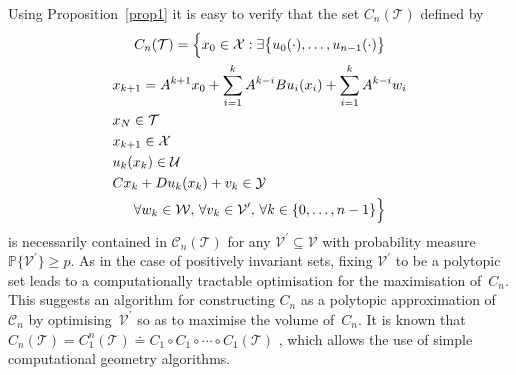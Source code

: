 \documentclass{ifacconf}
\providecommand{\C}{\mathscr C}
\providecommand{\W}{\mathcal W}
\providecommand{\V}{\mathcal V}
\providecommand{\X}{\mathcal X}
\providecommand{\Y}{\mathcal Y}
\providecommand{\U}{\mathcal U}
\providecommand{\T}{\mathcal T}
\providecommand{\PP}{\mathbb P}
\begin{document}
%
Using Proposition~\ref{prop1} it is easy to verify that the set $C_n(\T)$ defined by
%
\begin{multline*}
C_n(\T) = \Bigl\{ x_0\in\X: \exists \bigl\{u_0(\cdot),\ldots,u_{n-1}(\cdot)\bigr\}\\
\begin{aligned}
&x_{k+1} = A^{k+1} x_0 + \sum_{i=1}^{k} A^{k-i}B u_{i}(x_{i}) + \sum_{i=1}^{k} A^{k-i} w_{i}\\
&x_N\in\T\\
&x_{k+1}\in\X\\
&u_k(x_k)\in\U \\
&Cx_k+Du_k(x_k) + v_k \in\Y
\end{aligned}\\
\forall w_k\in\W,\, \forall v_k\in \V^\prime,\, \forall k\in\{0,\dots,n-1\} \Bigr\}	
\end{multline*}
%
is necessarily contained in $\C_n(\T)$ for any $\V^\prime\subseteq\V$ with probability measure $\PP\{\V^\prime\} \geq p$.
%
As in the case of positively invariant sets, fixing $\V^\prime$ to be a polytopic set leads to a computationally tractable optimisation for the maximisation of~$C_n$. This suggests an algorithm for constructing $C_n$ as a polytopic approximation of~$\C_n$ by optimising~$\V^\prime$ so as to maximise the volume of~$C_n$.
%
It is known that 
$C_n(\T) = C^n_1(\T) \doteq C_1 \circ C_1 \circ \cdots \circ C_1(\T)$ 
\citep[see e.g.][]{blanchini:2007}, which allows the use of simple computational geometry algorithms.
\end{document}

